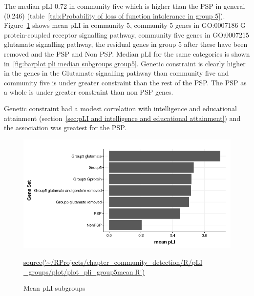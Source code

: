 The median pLI 0.72 in community five which is higher than the PSP in general (0.246) (table~\ref{tab:Probability of loss of function intolerance in group 5}). Figure~\ref{fig:barplot pli mean subgroups group5} shows mean pLI in community 5,  community 5 genes in GO:0007186  G protein-coupled receptor signalling pathway, community five genes in GO:0007215 glutamate signalling pathway, the residual genes in group 5 after these have been removed and the PSP and Non PSP. Median pLI for the same categories is shown in~\ref{fig:barplot pli median subgroups group5}. Genetic constraint is clearly higher in the genes in the Glutamate signalling pathway than community five and community five is under greater constraint than the rest of the PSP. The PSP as a whole is under greater constraint than non PSP genes. 

 Genetic constraint had a modest correlation with intelligence and educational attainment (section~\ref{sec:pLI and intelligence and educational attainment}) and the association was greatest for the PSP. 











\begin{figure}
    \centering
    \includegraphics[width=\textwidth]{images/chapter_community_detection/ggplot2/pLI_group5_glutamate/Rplot_meanPLI.png}
    \caption{Mean pLI subgroups}
    \tiny\url{source('~/RProjects/chapter_community_detection/R/pLI _groups/plot/plot_pli_group5mean.R')}
    \label{fig:barplot pli mean subgroups group5}
\end{figure}

